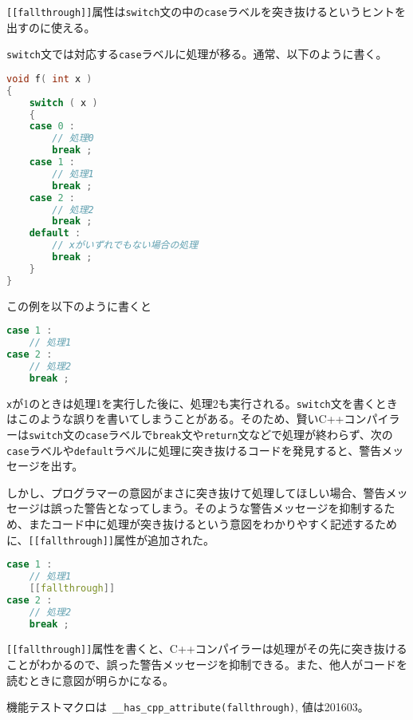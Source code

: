 %

\lstinline![[fallthrough]]!属性は\lstinline!switch!文の中の\lstinline!case!ラベルを突き抜けるというヒントを出すのに使える。

\lstinline!switch!文では対応する\lstinline!case!ラベルに処理が移る。通常、以下のように書く。

\begin{lstlisting}[language=C++]
void f( int x )
{
    switch ( x )
    {
    case 0 :
        // 処理0
        break ;
    case 1 :
        // 処理1
        break ;
    case 2 :
        // 処理2
        break ;
    default :
        // xがいずれでもない場合の処理
        break ;
    }
}
\end{lstlisting}

この例を以下のように書くと
\begin{lstlisting}[language=C++]
case 1 :
    // 処理1
case 2 :
    // 処理2
    break ;
\end{lstlisting}
\lstinline!x!が1のときは処理1を実行した後に、処理2も実行される。\lstinline!switch!文を書くときはこのような誤りを書いてしまうことがある。そのため、賢いC++コンパイラーは\lstinline!switch!文の\lstinline!case!ラベルで\lstinline!break!文や\lstinline!return!文などで処理が終わらず、次の\lstinline!case!ラベルや\lstinline!default!ラベルに処理に突き抜けるコードを発見すると、警告メッセージを出す。

しかし、プログラマーの意図がまさに突き抜けて処理してほしい場合、警告メッセージは誤った警告となってしまう。そのような警告メッセージを抑制するため、またコード中に処理が突き抜けるという意図をわかりやすく記述するために、\lstinline![[fallthrough]]!属性が追加された。

\begin{lstlisting}[language=C++]
case 1 :
    // 処理1
    [[fallthrough]]
case 2 :
    // 処理2
    break ;
\end{lstlisting}

\lstinline![[fallthrough]]!属性を書くと、C++コンパイラーは処理がその先に突き抜けることがわかるので、誤った警告メッセージを抑制できる。また、他人がコードを読むときに意図が明らかになる。

機能テストマクロは~\lstinline!__has_cpp_attribute(fallthrough)!,
値は201603。
